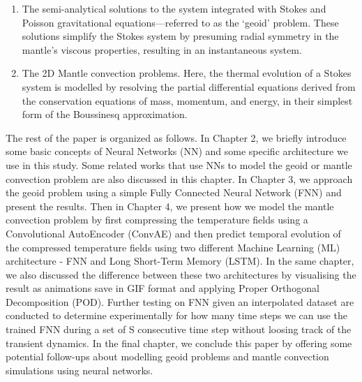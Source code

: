 \begin{enumerate}
    \item The semi-analytical solutions to the system integrated with Stokes and Poisson gravitational equations—referred to as the ‘geoid’ problem. These solutions simplify the Stokes system by presuming radial symmetry in the mantle’s viscous properties, resulting in an instantaneous system.

    \item The 2D Mantle convection problems. Here, the thermal evolution of a Stokes system is modelled by resolving the partial differential equations derived from the conservation equations of mass, momentum, and energy, in their simplest form of the Boussinesq approximation. 
\end{enumerate}

The rest of the paper is organized as follows. In Chapter 2, we briefly introduce some basic concepts of Neural Networks (NN) and some specific architecture we use in this study. Some related works that use NNs to model the geoid or mantle convection problem are also discussed in this chapter. In Chapter 3, we approach the geoid problem using a simple Fully Connected Neural Network (FNN) and present the results. Then in Chapter 4, we present how we model the mantle convection problem by first compressing the temperature fields using a Convolutional AutoEncoder (ConvAE) and then predict temporal evolution of the compressed temperature fields using two different Machine Learning (ML) architecture - FNN and Long Short-Term Memory (LSTM). In the same chapter, we also discussed the difference between these two architectures by visualising the result as animations save in GIF format and applying Proper Orthogonal Decomposition (POD). Further testing on FNN given an interpolated dataset are conducted to determine experimentally for how many time steps we can use the trained FNN during
a set of S consecutive time step without loosing track of the transient dynamics. In the final chapter, we conclude this paper by offering some potential follow-ups about modelling geoid problems and mantle convection simulations using neural networks.



